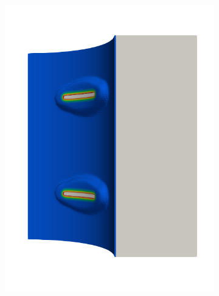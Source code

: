 \begin{frame}
\begin{columns}[T]
\begin{column}{0.6\textwidth}
\begin{figure}
{\begin{subfigure}{0.19\textwidth}
            \includegraphics[width=\textwidth]{Chapter345/figures/seed_d_3}
          \end{subfigure}
          \hspace{0.06\textwidth}
          \begin{subfigure}{0.19\textwidth}
            \centering

\end{subfigure}}
\end{figure}
\end{column}
\end{columns}
\end{frame}
